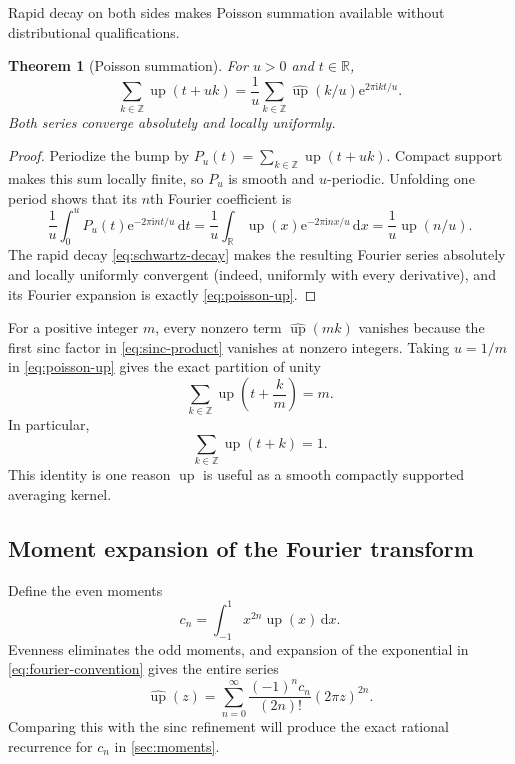 \documentclass[11pt,oneside]{article}
\newtheorem{theorem}{Theorem}[section]
\theoremstyle{definition}
\theoremstyle{remark}
\newcommand{\R}{\mathbb R}
\newcommand{\Z}{\mathbb Z}
\newcommand{\Up}{\operatorname{up}}
\newcommand{\e}{\mathrm e}
\newcommand{\ii}{\mathrm i}
\newcommand{\dd}{\,\mathrm d}
\begin{document}
Rapid decay on both sides makes Poisson summation available without distributional
qualifications.

\begin{theorem}[Poisson summation]
For $u>0$ and $t\in\R$,
\begin{equation}
 \sum_{k\in\Z}\Up(t+uk)
 =\frac1u\sum_{k\in\Z}\widehat{\Up}(k/u)
   \e^{2\pi\ii kt/u}.                                     \label{eq:poisson-up}
\end{equation}
Both series converge absolutely and locally uniformly.
\end{theorem}

\begin{proof}
Periodize the bump by $P_u(t)=\sum_{k\in\Z}\Up(t+uk)$.  Compact support makes this sum locally
finite, so $P_u$ is smooth and $u$-periodic.  Unfolding one period shows that its $n$th Fourier
coefficient is
\[
 \frac1u\int_0^uP_u(t)\e^{-2\pi\ii nt/u}\dd t
 =\frac1u\int_{\R}\Up(x)\e^{-2\pi\ii nx/u}\dd x
 =\frac1u\widehat{\Up}(n/u).
\]
The rapid decay \eqref{eq:schwartz-decay} makes the resulting Fourier series absolutely and
locally uniformly convergent (indeed, uniformly with every derivative), and its Fourier
expansion is exactly \eqref{eq:poisson-up}.
\end{proof}

For a positive integer $m$, every nonzero term $\widehat{\Up}(mk)$ vanishes because the
first sinc factor in \eqref{eq:sinc-product} vanishes at nonzero integers.  Taking
$u=1/m$ in \eqref{eq:poisson-up} gives the exact partition of unity
\begin{equation}
 \sum_{k\in\Z}\Up\!\left(t+\frac{k}{m}\right)=m.          \label{eq:partition-unity}
\end{equation}
In particular,
\begin{equation}
 \sum_{k\in\Z}\Up(t+k)=1.                                \label{eq:integer-partition}
\end{equation}
This identity is one reason $\Up$ is useful as a smooth compactly supported averaging
kernel.

\subsection{Moment expansion of the Fourier transform}

Define the even moments
\begin{equation}
 c_n=\int_{-1}^{1}x^{2n}\Up(x)\dd x.                       \label{eq:c-def}
\end{equation}
Evenness eliminates the odd moments, and expansion of the exponential in
\eqref{eq:fourier-convention} gives the entire series
\begin{equation}
 \widehat{\Up}(z)=\sum_{n=0}^{\infty}
   \frac{(-1)^n c_n}{(2n)!}(2\pi z)^{2n}.                  \label{eq:fourier-moment-series}
\end{equation}
Comparing this with the sinc refinement will produce the exact rational recurrence for
$c_n$ in \cref{sec:moments}.
\end{document}
